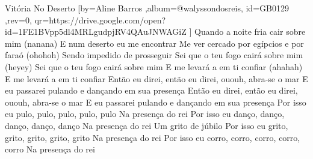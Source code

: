 \beginsong
{Vitória No Deserto %
}[by={Aline Barros %
},album={@walyssondosreis},
id={GB0129 %
},rev={0}, %
qr={https://drive.google.com/open?id=1FE1BVpp5dl4MRLgudpjRV4QAuJNWAGiZ %
}]
\beginverse*
Quando a noite fria cair sobre mim (nanana)
E num deserto eu me encontrar
Me ver cercado por egípcios e por faraó (ohohoh)
Sendo impedido de prosseguir
\endverse
\beginverse*
Sei que o teu fogo cairá sobre mim (heyey)
Sei que o teu fogo cairá sobre mim
E me levará a em ti confiar (ahahah)
E me levará a em ti confiar
\endverse
\beginchorus
Então eu direi, então eu direi, ououh, abra-se o mar
E eu passarei pulando e dançando em sua presença
Então eu direi, então eu direi, ououh, abra-se o mar
E eu passarei pulando e dançando em sua presença
\endchorus
\beginverse*
Por isso eu pulo, pulo, pulo, pulo, pulo
Na presença do rei
Por isso eu danço, danço, danço, danço, danço
Na presença do rei
Um grito de júbilo
Por isso eu grito, grito, grito, grito, grito
Na presença do rei
Por isso eu corro, corro, corro, corro, corro
Na presença do rei
\endverse

